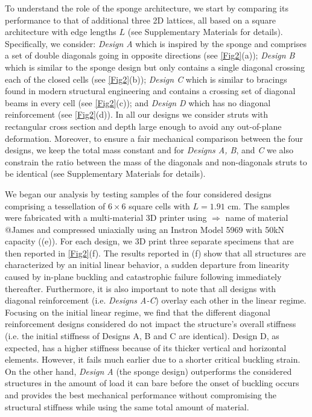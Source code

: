 \documentclass[9pt,twocolumn,twoside]{fernandes_paper}
\newcommand{\KB}[1]{\noindent\color{blue}$\Longrightarrow$ #1\normalcolor}
\newcommand{\mf}[1]{\noindent\color{orange}{$\Longrightarrow$#1}\normalcolor}
\begin{document}
To understand the role of the sponge architecture, we start by comparing its performance to that of additional three 2D lattices, all based on a square architecture with edge lengths $L$ (see Supplementary Materials for details). Specifically,  we  consider:
\emph{Design A}  which is inspired by the sponge and comprises a set of double diagonals going in opposite directions (see \cref{Fig2}(a)); \emph{Design B}  which is similar to the sponge design but only contains a single diagonal crossing each of the closed cells (see \cref{Fig2}(b)); \emph{Design C} which is similar to bracings found in modern structural engineering and contains a crossing set of diagonal beams in every cell (see \cref{Fig2}(c)); and \emph{Design D}  which  has no diagonal reinforcement (see \cref{Fig2}(d)). In all our designs we consider struts with rectangular cross section and depth large enough to avoid any out-of-plane deformation. Moreover, to ensure a fair mechanical comparison between the four designs, we keep the total mass constant and
for \emph{Designs A, B}, and \emph{C} we also constrain the  ratio between the mass of the diagonals and non-diagonals struts to be identical (see Supplementary Materials for details).  %

We began our analysis by testing samples of the four considered designs comprising a tessellation of $6\times6$ square cells with $L=1.91$ cm. The samples were fabricated with a multi-material 3D printer \mf{(add model @James)} using \KB{name of material @James} and compressed uniaxially using an Instron Model 5969 with 50kN capacity ((e)). For each design, we 3D print three separate specimens that are then reported in \cref{Fig2}(f). The results reported in (f) show that all structures are characterized by an initial linear behavior, a sudden departure from linearity caused by in-plane buckling and catastrophic failure following immediately thereafter. Furthermore, it is also important to note that all designs with diagonal reinforcement (i.e. \emph{Designs A-C}) overlay each other in the linear regime. Focusing on the initial linear regime, we find that  the different diagonal reinforcement designs considered do not impact the structure's overall stiffness (i.e. the initial stiffness of Designs A, B and C are identical). Design D, as expected, has a higher stiffness because of its thicker vertical and horizontal elements. However, it fails much earlier due to a shorter critical buckling strain. On the other hand, \emph{Design A} (the sponge design) outperforms the considered structures in the amount of load it can bare before the onset of buckling occurs and provides the best mechanical performance without compromising the structural stiffness while using the same total amount of material.
\end{document}
